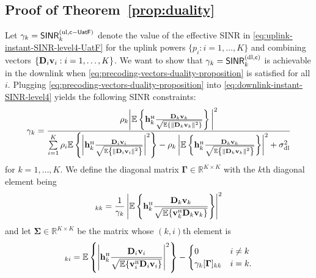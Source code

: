 \documentclass[SIG,biber]{nowfnt}
\newcommand{\mathacr}[1]{\mathsf{#1}}
\newcommand{\vect}[1]{\mathbf{#1}}
\def\Htran{\mbox{\tiny $\mathrm{H}$}}
\def\cent{\mathsf{c}}
\def\centuatf{\mathsf{c-UatF}}
\begin{document}
\subsection{Proof of Theorem~\ref{prop:duality}}\label{proof-of-prop:duality}


	
	Let $\gamma_{k} = \mathacr{SINR}_{k}^{({\rm ul},\centuatf)}$ denote the value of the effective SINR in \eqref{eq:uplink-instant-SINR-level4-UatF} for the uplink powers $\{p_i: i=1,\ldots,K\}$ and combining vectors $\{ \vect{D}_i {\bf v}_{i}: i=1,\ldots,K\}$. We want to show that $\gamma_{k} = \mathacr{SINR}_{k}^{({\rm dl,\cent})}$ is achievable in the downlink when \eqref{eq:precoding-vectors-duality-proposition} is satisfied for all $i$. Plugging \eqref{eq:precoding-vectors-duality-proposition} into \eqref{eq:downlink-instant-SINR-level4} yields the following SINR constraints:
	\begin{align} 
	\gamma_k  =\frac{{\rho_{k}}\bigg|    \mathbb{E} \left\{ \vect{h}_{k}^{\Htran}  \frac{\vect{D}_{k}{\bf v}_{k}}{\sqrt{\mathbb{E} \{ \| \vect{D}_k{\vect{v}}_{k} \|^2 \}}}  \right\} \bigg|^2 }{ \sum\limits_{i=1}^{K} {\rho_{i}}\mathbb{E} \left\{ \left|  \vect{h}_{k}^{\Htran}  \frac{ \vect{D}_{i} {\bf v}_{i}}{\sqrt{\mathbb{E} \left\{ \left\| \vect{D}_i{\vect{v}}_{i} \right\|^2 \right\}}}   \right|^2 \right\} - {\rho_{k}} \left|   \mathbb{E} \left\{ \vect{h}_{k}^{\Htran}  \frac{ \vect{D}_{k} {\bf v}_{k}}{\sqrt{\mathbb{E} \left\{ \left\| \vect{D}_k{\vect{v}}_{k} \right\|^2\right\}}}  \right\} \right|^2 + \sigma_{\rm dl}^2 }\label{eq:downlink-SINR-level4-proof}
	\end{align}
	for $k=1,\ldots,K$. We define the diagonal matrix $\vect{\Gamma} \in \mathbb{R}^{K \times K}$ with the $k$th diagonal element being
	\begin{align}
	[\vect{\Gamma}]_{kk} =\frac{1}{\gamma_k}\left|    \mathbb{E} \left\{ \vect{h}_{k}^{\Htran}  \frac{\vect{D}_{k} {\bf v}_{k}}{\sqrt{\mathbb{E} \{ {\vect{v}}_{k}^{\Htran}\vect{D}_{k} {\vect{v}}_{k} \}}}  \right\} \right|^2
	\end{align}
	and let $\vect{\Sigma} \in \mathbb{R}^{K \times K}$ be the matrix whose $(k,i)$th element is
	\begin{align}
	[\vect{\Sigma}]_{ki} = \mathbb{E} \left\{ \left|  \vect{h}_{k}^{\Htran}  \frac{\vect{D}_{i}{\bf v}_{i}}{\sqrt{\mathbb{E} \{ {\vect{v}}_{i}^{\Htran}\vect{D}_{i} {\vect{v}}_{i} \}}}   \right|^2 \right\} - \begin{cases}
	0 & i \ne k \\
	\gamma_k[\vect{\Gamma}]_{kk}& i=k.
	\end{cases}
	\end{align}
\end{document}
